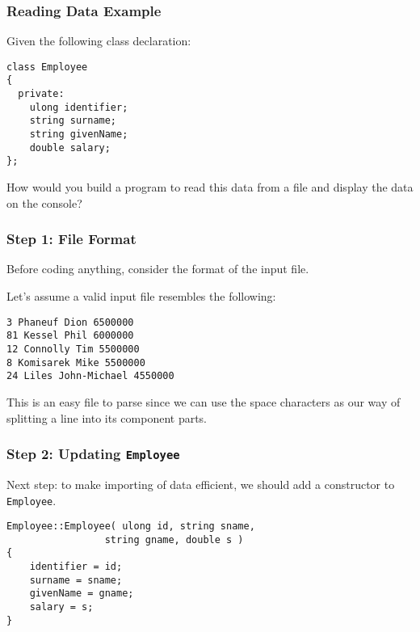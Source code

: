 \begin{frame}[fragile]
\frametitle{Reading Data Example}

Given the following class declaration:

\begin{verbatim}
class Employee
{
  private: 
    ulong identifier;
    string surname;
    string givenName;
    double salary;
};
\end{verbatim}

How would you build a program to read this data from a file and display the data on the console?

\end{frame}

\begin{frame}[fragile]
\frametitle{Step 1: File Format}
Before coding anything, consider the format of the input file.

Let's assume a valid input file resembles the following:

\begin{verbatim}
3 Phaneuf Dion 6500000
81 Kessel Phil 6000000
12 Connolly Tim 5500000
8 Komisarek Mike 5500000
24 Liles John-Michael 4550000
\end{verbatim}

This is an easy file to parse since we can use the space characters as our way of splitting a line into its component parts.


\end{frame}

\begin{frame}[fragile]
\frametitle{Step 2: Updating \texttt{Employee}}
Next step: to make importing of data efficient, we should add a constructor to \texttt{Employee}.

\begin{verbatim}
Employee::Employee( ulong id, string sname, 
                 string gname, double s )
{
    identifier = id;
    surname = sname;
    givenName = gname;
    salary = s;
}
\end{verbatim}

\end{frame}

